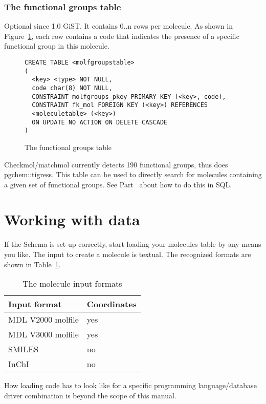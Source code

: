 \documentclass[a4paper]{article}
\begin{document}
\section{The functional groups table}
Optional since 1.0 GiST. It contains 0..n rows per molecule. As shown in Figure~\ref{fig:fgroups_table}, each row contains a code that indicates the presence of a specific functional group in this molecule.
\begin{figure}[tb]
\begin{verbatim}
CREATE TABLE <molfgroupstable>
(
  <key> <type> NOT NULL,
  code char(8) NOT NULL,
  CONSTRAINT molfgroups_pkey PRIMARY KEY (<key>, code),
  CONSTRAINT fk_mol FOREIGN KEY (<key>) REFERENCES
  <moleculetable> (<key>)
  ON UPDATE NO ACTION ON DELETE CASCADE
)
\end{verbatim}
\caption{The functional groups table}
	\label{fig:fgroups_table}
\end{figure}
Checkmol/matchmol currently detects 190 functional groups, thus does pgchem::tigress. This table can be used to directly search for molecules containing a given set of functional groups. See Part~\ref{part:wwd} about how to do this in SQL.
\part{Working with data}
\label{part:wwd}
If the Schema is set up correctly, start loading your molecules table by any means you like. The input to create a molecule is textual. The recognized formats are shown in Table~\ref{tbl:mol_inpf}.
\begin{table}[h]
\begin{tabular}{|l|l|}
\hline 
	\textbf{Input format} & \textbf{Coordinates}\\
	\hline 
  MDL V2000 molfile	& yes\\
  \hline 
  MDL V3000 molfile	& yes\\
  \hline 
  SMILES	& no\\
  \hline 
  InChI	& no\\
  \hline 
\end{tabular}
\caption{The molecule input formats}
\label{tbl:mol_inpf}
\end{table}
How loading code has to look like for a specific programming language/database driver combination is beyond the scope of this manual.
\end{document}
